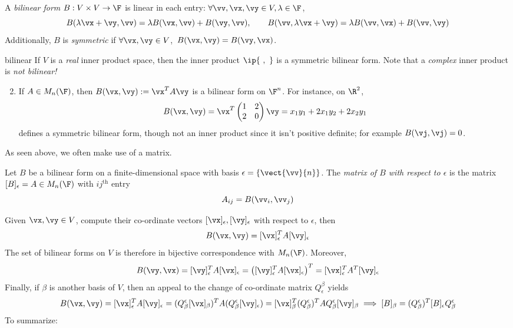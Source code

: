\begin{defn}{}{}
A \emph{bilinear form} $B:V\times V\to\F$ is linear in each entry: $\forall \vv,\vx,\vy\in V,\lambda\in\F$,
  \[B(\lambda\vx+\vy,\vv)=\lambda B(\vx,\vv)+B(\vy,\vv),\qquad B(\vv,\lambda\vx+\vy)=\lambda B(\vv,\vx)+B(\vv,\vy)\]
Additionally, $B$ is \emph{symmetric} if $\forall \vx,\vy\in V$,\ $B(\vx,\vy)=B(\vy,\vx)$.
\end{defn}

\begin{examples}{}{bilinear}
\exstart If $V$ is a \emph{real} inner product space, then the inner product $\ip{\ ,\ }$ is a symmetric bilinear form. Note that a \emph{complex} inner product is \emph{not bilinear!}

\begin{enumerate}\setcounter{enumi}{1}
	\item\label{ex:bilinear1} If $A\in M_n(\F)$, then $B(\vx,\vy):=\vx^TA\vy$ is a bilinear form on $\F^n$. For instance, on $\R^2$,
	\[B(\vx,\vy)=\vx^T\begin{pmatrix}
	1&2\\2&0
	\end{pmatrix}\vy =x_1y_1+2x_1y_2+2x_2y_1\]
	defines a symmetric bilinear form, though not an inner product since it isn't positive definite; for example $B(\vj,\vj)=0$.
% 	
\end{enumerate}
\end{examples}

As seen above, we often make use of a matrix.

\begin{defn}{}{}
Let $B$ be a bilinear form on a finite-dimensional space with basis $\epsilon=\{\vect{\vv}{n}\}$. The \emph{matrix of $B$ with respect to $\epsilon$} is the matrix $[B]_\epsilon=A\in M_n(\F)$ with $ij^\text{th}$ entry
\[A_{ij}=B(\vv_i,\vv_j)\]
\end{defn}

Given $\vx,\vy\in V$, compute their co-ordinate vectors $[\vx]_\epsilon,[\vy]_\epsilon$ with respect to $\epsilon$, then
\[B(\vx,\vy)=[\vx]_\epsilon^TA[\vy]_\epsilon\]
The set of bilinear forms on $V$ is therefore in bijective correspondence with $M_n(\F)$. Moreover,
\[B(\vy,\vx)=[\vy]_\epsilon^TA[\vx]_\epsilon=\left([\vy]_\epsilon^TA[\vx]_\epsilon\right)^T=[\vx]_\epsilon^TA^T[\vy]_\epsilon\]
Finally, if $\beta$ is another basis of $V$, then an appeal to the change of co-ordinate matrix $Q_\epsilon^\beta$ yields
\[B(\vx,\vy)=[\vx]_\epsilon^TA[\vy]_\epsilon =(Q_\beta^\epsilon[\vx]_\beta)^TA(Q_\beta^\epsilon[\vy]_\epsilon) =[\vx]_\beta^T(Q_\beta^\epsilon)^TAQ_\beta^\epsilon[\vy]_\beta \implies [B]_\beta=(Q_\beta^\epsilon)^T[B]_\epsilon Q_\beta^\epsilon\]
To summarize:

